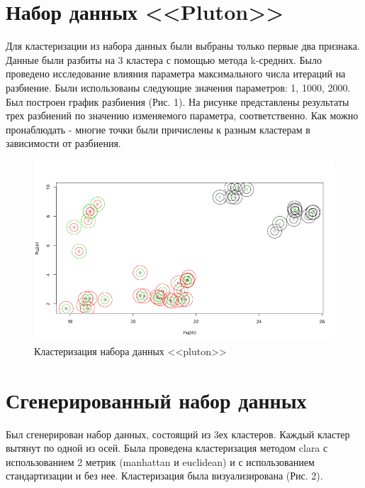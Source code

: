 \documentclass[]{article}
\numberwithin{equation}{section}
\begin{document}
    \section{Набор данных <<Pluton>>}

    Для кластеризации из набора данных были выбраны только первые два признака. Данные были разбиты на 3 кластера с помощью метода k-средних. Было проведено исследование влияния параметра максимального числа итераций на разбиение. Были использованы следующие значения параметров: 1, 1000, 2000. Был построен график разбиения (Рис. 1). На рисунке представлены результаты трех разбиений по значению изменяемого параметра, соответственно. Как можно пронаблюдать - многие точки были причислены к разным кластерам в зависимости от разбиения.

    \begin{figure}[H]
        \centering
        \includegraphics[width = 0.9\linewidth]{data/pluton_clustering.png}
        \caption{Кластеризация набора данных <<pluton>>}
    \end{figure}

    \section{Сгенерированный набор данных}
    Был сгенерирован набор данных, состоящий из 3ех кластеров. Каждый кластер вытянут по одной из осей. Была проведена кластеризация методом clara с использованием 2 метрик (manhattan и euclidean) и с использованием стандартизации и без нее. Кластеризация была визуализирована (Рис. 2).
\end{document}
